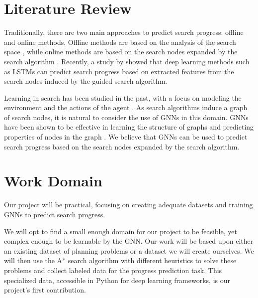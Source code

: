 \documentclass[11pt]{article}
\begin{document}




\section{Literature Review}

Traditionally, there are two main approaches to predict search progress: offline and online methods. Offline methods are based on the analysis of the search space \cite{??,??}, while online methods are based on the search nodes expanded by the search algorithm \cite{??,??}. Recently, a study by \citet{sudry2022learning} showed that deep learning methods such as LSTMs can predict search progress based on extracted features from the search nodes induced by the guided search algorithm. 

Learning in search has been studied in the past, with a focus on modeling the environment and the actions of the agent \cite{??,??}. As search algorithms induce a graph of search nodes, it is natural to consider the use of GNNs in this domain. GNNs have been shown to be effective in learning the structure of graphs and predicting properties of nodes in the graph \cite{??,??}. We believe that GNNs can be used to predict search progress based on the search nodes expanded by the search algorithm.


\section{Work Domain}

Our project will be practical, focusing on creating adequate datasets and training GNNs to predict search progress. 

We will opt to find a small enough domain for our project to be feasible, yet complex enough to be learnable by the GNN. Our work will be based upon either an existing dataset of planning problems or a dataset we will create ourselves. We will then use the A* search algorithm with different heuristics to solve these problems and collect labeled data for the progress prediction task.
This specialized data, accessible in Python for deep learning frameworks, is our project's first contribution.
\end{document}
